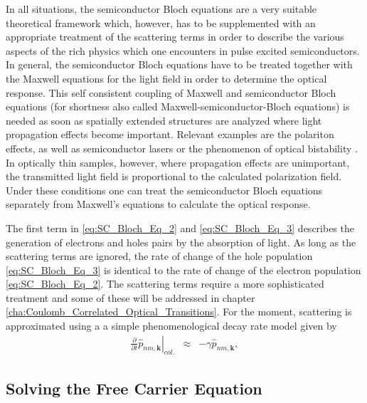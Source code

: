 In all situations, the semiconductor Bloch equations are a very suitable
theoretical framework which, however, has to be supplemented with
an appropriate treatment of the scattering terms in order to describe
the various aspects of the rich physics which one encounters in pulse
excited semiconductors. In general, the semiconductor Bloch equations
have to be treated together with the Maxwell equations for the light
field in order to determine the optical response. This self consistent
coupling of Maxwell and semiconductor Bloch equations (for shortness
also called Maxwell-semiconductor-Bloch equations) is needed as soon
as spatially extended structures are analyzed where light propagation
effects become important. Relevant examples are the polariton effects,
as well as semiconductor lasers or the phenomenon of optical bistability
\citet{Haug2009}. In optically thin samples, however, where propagation
effects are unimportant, the transmitted light field is proportional
to the calculated polarization field. Under these conditions one can
treat the semiconductor Bloch equations separately from Maxwell's
equations to calculate the optical response.

The first term in \ref{eq:SC_Bloch_Eq_2} and \ref{eq:SC_Bloch_Eq_3}
describes the generation of electrons and holes pairs by the absorption
of light. As long as the scattering terms are ignored, the rate of
change of the hole population \ref{eq:SC_Bloch_Eq_3} is identical
to the rate of change of the electron population \ref{eq:SC_Bloch_Eq_2}.
The scattering terms require a more sophisticated treatment and some
of these will be addressed in chapter \ref{cha:Coulomb_Correlated_Optical_Transitions}.
For the moment, scattering is approximated using a a simple phenomenological
decay rate model given by\begin{eqnarray}
\left.\frac{\partial}{\partial t}\hat{p}_{nm,\mathbf{k}}\right|_{col.} & \approx & -\gamma\hat{p}_{nm,\mathbf{k}},\end{eqnarray}



\subsection{Solving the Free Carrier Equation}

